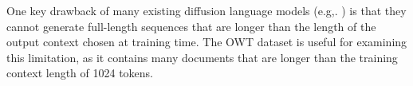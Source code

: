 \documentclass{article} %
\newcommand{\TODO}[1]{\textcolor{red}{[TODO: #1]}}
\def\algos{BD3-LMs}
\begin{document}


One key drawback of many existing diffusion language models (e.g,. \citet{austin2021structured,lou2024discrete}) is that they cannot generate full-length sequences that are longer than the length of the output context chosen at training time. The OWT dataset is useful for examining this limitation, as it contains many documents that are longer than the training context length of 1024 tokens. 
\end{document}
